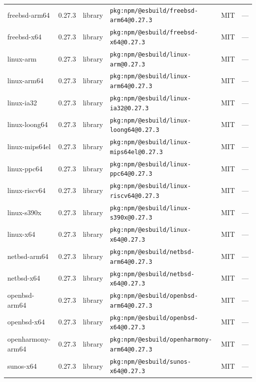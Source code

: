 \documentclass[11pt,a4paper]{article}
\begin{document}
\begin{longtable}{|p{4cm}|p{2cm}|p{1.6cm}|p{5cm}|p{1.5cm}|p{3.5cm}|}
\raggedright freebsd-arm64 & 0.27.3 & library & \small\texttt{pkg:npm/@esbuild/freebsd-arm64@0.27.3} & MIT & \small — \\
\raggedright freebsd-x64 & 0.27.3 & library & \small\texttt{pkg:npm/@esbuild/freebsd-x64@0.27.3} & MIT & \small — \\
\raggedright linux-arm & 0.27.3 & library & \small\texttt{pkg:npm/@esbuild/linux-arm@0.27.3} & MIT & \small — \\
\raggedright linux-arm64 & 0.27.3 & library & \small\texttt{pkg:npm/@esbuild/linux-arm64@0.27.3} & MIT & \small — \\
\raggedright linux-ia32 & 0.27.3 & library & \small\texttt{pkg:npm/@esbuild/linux-ia32@0.27.3} & MIT & \small — \\
\raggedright linux-loong64 & 0.27.3 & library & \small\texttt{pkg:npm/@esbuild/linux-loong64@0.27.3} & MIT & \small — \\
\raggedright linux-mips64el & 0.27.3 & library & \small\texttt{pkg:npm/@esbuild/linux-mips64el@0.27.3} & MIT & \small — \\
\raggedright linux-ppc64 & 0.27.3 & library & \small\texttt{pkg:npm/@esbuild/linux-ppc64@0.27.3} & MIT & \small — \\
\raggedright linux-riscv64 & 0.27.3 & library & \small\texttt{pkg:npm/@esbuild/linux-riscv64@0.27.3} & MIT & \small — \\
\raggedright linux-s390x & 0.27.3 & library & \small\texttt{pkg:npm/@esbuild/linux-s390x@0.27.3} & MIT & \small — \\
\raggedright linux-x64 & 0.27.3 & library & \small\texttt{pkg:npm/@esbuild/linux-x64@0.27.3} & MIT & \small — \\
\raggedright netbsd-arm64 & 0.27.3 & library & \small\texttt{pkg:npm/@esbuild/netbsd-arm64@0.27.3} & MIT & \small — \\
\raggedright netbsd-x64 & 0.27.3 & library & \small\texttt{pkg:npm/@esbuild/netbsd-x64@0.27.3} & MIT & \small — \\
\raggedright openbsd-arm64 & 0.27.3 & library & \small\texttt{pkg:npm/@esbuild/openbsd-arm64@0.27.3} & MIT & \small — \\
\raggedright openbsd-x64 & 0.27.3 & library & \small\texttt{pkg:npm/@esbuild/openbsd-x64@0.27.3} & MIT & \small — \\
\raggedright openharmony-arm64 & 0.27.3 & library & \small\texttt{pkg:npm/@esbuild/openharmony-arm64@0.27.3} & MIT & \small — \\
\raggedright sunos-x64 & 0.27.3 & library & \small\texttt{pkg:npm/@esbuild/sunos-x64@0.27.3} & MIT & \small — \\

\end{longtable}
\end{document}
